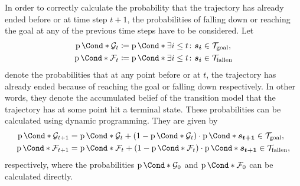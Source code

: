 In order to correctly calculate the probability that the trajectory has already ended before or at time step $t+1$, the probabilities of falling down or reaching the goal at any of the previous time steps have to be considered.
Let
\begin{align}
    \begin{split}
        \Prob*{\PGoal_t} &\coloneqq \Prob*{\exists i \leq t \colon \mat{s_i} \in \Goal}, \\
        \Prob*{\PFallen_t} &\coloneqq \Prob*{\exists i \leq t \colon \mat{s_i} \in \Fallen}
    \end{split}
\end{align}
denote the probabilities that at any point before or at $t$, the trajectory has already ended because of reaching the goal or falling down respectively.
In other words, they denote the accumulated belief of the transition model that the trajectory has at some point hit a terminal state.
These probabilities can be calculated using dynamic programming.
They are given by
\begin{align}
    \begin{split}
        \Prob*{\PGoal_{t+1}} &= \Prob*{\PGoal_{t}} + \left( 1 - \Prob*{\PGoal_{t}}  \right) \cdot \Prob*{\mat{s_{t+1}} \in \Goal}, \\
        \Prob*{\PFallen_{t+1}} &= \Prob*{\PFallen_{t}} + \left( 1 - \Prob*{\PFallen_{t}}  \right) \cdot \Prob*{\mat{s_{t+1}} \in \Fallen},
    \end{split}
\end{align}
respectively, where the probabilities $\Prob*{\PGoal_{0}}$ and $\Prob*{\PFallen_{0}}$ can be calculated directly.

